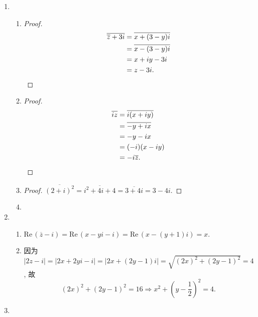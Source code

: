 \documentclass[a4paper, 11pt]{book}
\newcommand{\re}{\mathrm{Re}\,}
\begin{document}
\begin{enumerate}
\item %
    \begin{enumerate}
        \item %
            \begin{proof}
                \begin{align*}
                    \overline{\overline{z}+3i} &= \overline{x+(3-y)i} \\
                    &= \overline{x-(3-y)i} \\
                    &= x+iy - 3i \\
                    &= z - 3i. \qedhere
                \end{align*}
            \end{proof}
        \item %
            \begin{proof}
                \begin{align*}
                    \overline{iz} &= \overline{i(x+iy)} \\
                    &= \overline{-y+ix} \\
                    &= -y-ix \\
                    &=(-i)(x-iy) \\
                    &=-i\overline{z}. \qedhere
                \end{align*}
            \end{proof}
        \item %
            \begin{proof}
                $\overline{(2+i)^2} = \overline{i^2+4i+4} = \overline{3+4i} = 3-4i$.
            \end{proof}
        \item %
    \end{enumerate}
\item %
    \begin{enumerate}
        \item %
            $
                \re(\overline{z} - i) = \re(x-yi-i)
                = \re(x - (y+1)i)
                = x.
            $
        \item %
            因为 $|2z-i| = |2x + 2yi - i| = |2x + (2y-1)i| = \sqrt{(2x)^2 + (2y-1)^2} = 4$,
            故
            \[
                (2x)^2 + (2y-1)^2 = 16
                \Rightarrow
                x^2 + \left(y-\frac12\right)^2 = 4.  
            \]
    \end{enumerate}
\item %

\end{enumerate}
\end{document}
